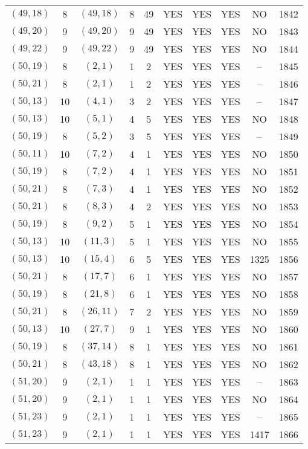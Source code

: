 \begin{longtable}{|c|c|c|c|c|c|c|c|c|c|}
$(49, 18)$ & 8 & $(49, 18)$ & 8 & 49 & YES & YES & YES & NO & 1842\\
$(49, 20)$ & 9 & $(49, 20)$ & 9 & 49 & YES & YES & YES & NO & 1843\\
$(49, 22)$ & 9 & $(49, 22)$ & 9 & 49 & YES & YES & YES & NO & 1844\\
$(50, 19)$ & 8 & $(2, 1)$ & 1 & 2 & YES & YES & YES & -- & 1845\\
$(50, 21)$ & 8 & $(2, 1)$ & 1 & 2 & YES & YES & YES & -- & 1846\\
$(50, 13)$ & 10 & $(4, 1)$ & 3 & 2 & YES & YES & YES & -- & 1847\\
$(50, 13)$ & 10 & $(5, 1)$ & 4 & 5 & YES & YES & YES & NO & 1848\\
$(50, 19)$ & 8 & $(5, 2)$ & 3 & 5 & YES & YES & YES & -- & 1849\\
$(50, 11)$ & 10 & $(7, 2)$ & 4 & 1 & YES & YES & YES & NO & 1850\\
$(50, 19)$ & 8 & $(7, 2)$ & 4 & 1 & YES & YES & YES & NO & 1851\\
$(50, 21)$ & 8 & $(7, 3)$ & 4 & 1 & YES & YES & YES & NO & 1852\\
$(50, 21)$ & 8 & $(8, 3)$ & 4 & 2 & YES & YES & YES & NO & 1853\\
$(50, 19)$ & 8 & $(9, 2)$ & 5 & 1 & YES & YES & YES & NO & 1854\\
$(50, 13)$ & 10 & $(11, 3)$ & 5 & 1 & YES & YES & YES & NO & 1855\\
$(50, 13)$ & 10 & $(15, 4)$ & 6 & 5 & YES & YES & YES & 1325 & 1856\\
$(50, 21)$ & 8 & $(17, 7)$ & 6 & 1 & YES & YES & YES & NO & 1857\\
$(50, 19)$ & 8 & $(21, 8)$ & 6 & 1 & YES & YES & YES & NO & 1858\\
$(50, 21)$ & 8 & $(26, 11)$ & 7 & 2 & YES & YES & YES & NO & 1859\\
$(50, 13)$ & 10 & $(27, 7)$ & 9 & 1 & YES & YES & YES & NO & 1860\\
$(50, 19)$ & 8 & $(37, 14)$ & 8 & 1 & YES & YES & YES & NO & 1861\\
$(50, 21)$ & 8 & $(43, 18)$ & 8 & 1 & YES & YES & YES & NO & 1862\\
$(51, 20)$ & 9 & $(2, 1)$ & 1 & 1 & YES & YES & YES & -- & 1863\\
$(51, 20)$ & 9 & $(2, 1)$ & 1 & 1 & YES & YES & YES & NO & 1864\\
$(51, 23)$ & 9 & $(2, 1)$ & 1 & 1 & YES & YES & YES & -- & 1865\\
$(51, 23)$ & 9 & $(2, 1)$ & 1 & 1 & YES & YES & YES & 1417 & 1866\\

\end{longtable}
